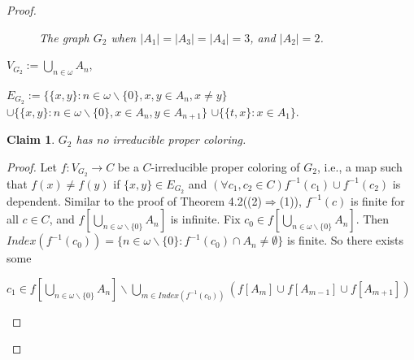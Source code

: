 \documentclass[12pt,reqno,a4paper]{amsart}
\theoremstyle{definition}
\newtheorem{claim}[defn]{Claim}
\begin{document}
\begin{proof}
\begin{figure}[!ht]
\begin{minipage}{\textwidth}
			\end{minipage}
			\caption{\em The graph $G_{2}$ when $\vert A_{1}\vert = \vert A_{3}\vert = \vert A_{4}\vert=3$, and $\vert A_{2}\vert=2$.}
		\end{figure}
		
		\begin{flushleft}
			$V_{G_{2}} := \bigcup_{n\in \omega}A_{n}$, 
			
			$E_{G_{2}} := \bigg\{\{x, y\}: n\in\omega\backslash\{0\}, x,y\in A_{n}, x\not=y\bigg\}$
			$\cup \bigg\{\{x,y\}:n\in \omega\backslash\{0\}, x\in A_{n}, y\in A_{n+1}\bigg\}$
			$\cup \bigg\{\{t,x\}:x\in A_{1}\bigg\}$.
		\end{flushleft}
		
		\begin{claim}
			{\em $G_{2}$ has no irreducible proper coloring.}
		\end{claim}
		\begin{proof}
			Let $f: V_{G_{2}} \rightarrow C$ be a $C$-irreducible proper coloring of $G_{2}$, i.e., a map such that $f(x) \neq f(y)$ if $\{x,y\}\in E_{G_{2}}$ and $(\forall c_{1},c_{2}\in C) f^{-1}(c_{1})\cup f^{-1}(c_{2})$ is dependent. Similar to the proof of Theorem 4.2((2)$\Rightarrow$(1)), $f^{-1}(c)$ is finite for all $c \in C$, and $f[\bigcup_{n\in \omega\backslash\{0\}}A_{n}]$ is infinite.
			Fix $c_{0} \in f[\bigcup_{n\in \omega\backslash\{0\}}A_{n}]$. Then $Index(f^{-1}(c_{0})) = \{n \in \omega\backslash \{0\} : f^{-1}(c_{0}) \cap A_{n} \neq \emptyset\}$ is finite. So there exists some
			
			\begin{center}
				$c_{1} \in f[\bigcup_{n\in \omega\backslash \{0\}}A_{n}]\backslash \bigcup_{m\in Index(f^{-1}(c_{0}))} (f[A_{m}]\cup f[A_{m-1}] \cup f[A_{m+1}])$
			\end{center}
			

\end{proof}
\end{proof}
\end{document}
